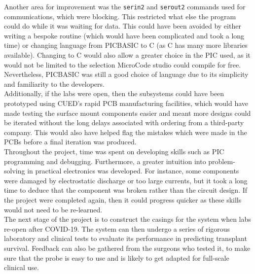 Another area for improvement was the \verb|serin2| and \verb|serout2| commands used for communications, which were blocking. This restricted what else the program could do while it was waiting for data. This could have been avoided by either writing a bespoke routine (which would have been complicated and took a long time) or changing language from PICBASIC to C (as C has many more libraries available). Changing to C would also allow a greater choice in the PIC used, as it would not be limited to the selection MicroCode studio could compile for free. Nevertheless, PICBASIC was still a good choice of language due to its simplicity and familiarity to the developers.\\

Additionally, if the labs were open, then the subsystems could have been prototyped using CUED's rapid PCB manufacturing facilities, which would have made testing the surface mount components easier and meant more designs could be iterated without the long delays associated with ordering from a third-party company. This would also have helped flag the mistakes which were made in the PCBs before a final iteration was produced. \\

Throughout the project, time was spent on developing skills such as PIC programming and debugging. Furthermore, a greater intuition into problem-solving in practical electronics was developed. For instance, some components were damaged by electrostatic discharge or too large currents, but it took a long time to deduce that the component was broken rather than the circuit design. If the project were completed again, then it could progress quicker as these skills would not need to be re-learned. \\

The next stage of the project is to construct the casings for the system when labs re-open after COVID-19. The system can then undergo a series of rigorous laboratory and clinical tests to evaluate its performance in predicting transplant survival. Feedback can also be gathered from the surgeons who tested it, to make sure that the probe is easy to use and is likely to get adapted for full-scale clinical use.\\